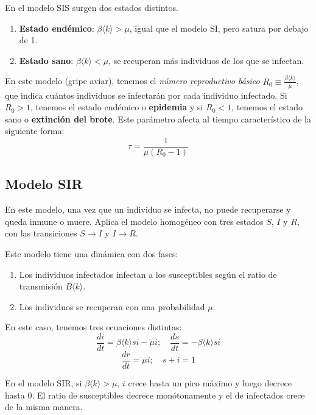 \documentclass[10pt,spanish, landscape, twocolumn]{article}
\begin{document}
En el modelo SIS surgen dos estados distintos.

\begin{enumerate}[---]
    \item \textbf{\textcolor{temasiete}{Estado endémico}}: $\beta\langle k \rangle>\mu$, igual que el modelo SI, pero satura por debajo de 1.
    \item \textbf{\textcolor{temasiete}{Estado sano}}: $\beta\langle k \rangle < \mu$, se recuperan más individuos de los que se infectan.
\end{enumerate}

En este modelo (gripe aviar), tenemos el \textit{\textcolor{temasiete}{número reproductivo básico}} $R_0 \equiv \frac{\beta\langle k \rangle}{\mu}$, que indica cuántos individuos se infectarán por cada individuo infectado. Si $R_0 > 1$, tenemos el estado endémico o \textbf{\textcolor{temasiete}{epidemia}} y si $R_0 < 1$, tenemos el estado sano o \textbf{\textcolor{temasiete}{extinción del brote}}. Este parámetro afecta al tiempo característico de la siguiente forma: $$\tau = \frac{1}{\mu(R_0-1)}$$

\subsection{\textcolor{temasiete}Modelo SIR}

En este modelo, una vez que un individuo se infecta, no puede recuperarse y queda inmune o muere. Aplica el modelo homogéneo con tres estados $S$, $I$ y $R$, con las transiciones $S\rightarrow I$ y $I \rightarrow R$. 

Este modelo tiene una dinámica con dos fases:

\begin{enumerate}
    \item Los individuos infectados infectan a los susceptibles según el ratio de transmisión $B\langle k \rangle$.
    \item Los individuos se recuperan con una probabilidad $\mu$.
\end{enumerate}

En este caso, tenemos tres ecuaciones distintas:
$$\frac{di}{dt} =  \beta \langle k \rangle si - \mu i; \quad \frac{ds}{dt} = - \beta \langle k \rangle si$$$$\frac{dr}{dt} = \mu i; \quad s + i = 1$$

En el modelo SIR, si $\beta\langle k \rangle > \mu$, $i$ crece hasta un pico máximo y luego decrece hasta 0. El ratio de susceptibles decrece monótonamente y el de infectados crece de la misma manera.
\end{document}
